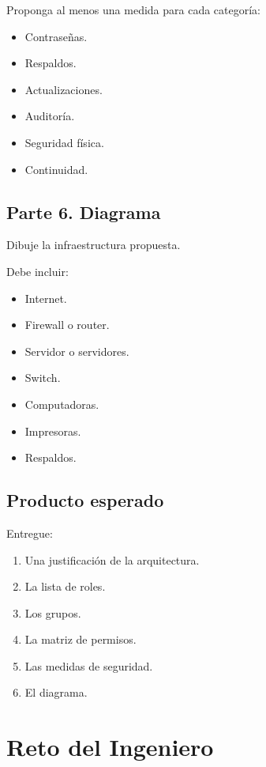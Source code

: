 \documentclass[
  spanish,
  letterpaper,
]{scrbook}
\providecommand{\tightlist}{%
  \setlength{\itemsep}{0pt}\setlength{\parskip}{0pt}}
\begin{document}
Proponga al menos una medida para cada categoría:

\begin{itemize}
\tightlist
\item
  Contraseñas.
\item
  Respaldos.
\item
  Actualizaciones.
\item
  Auditoría.
\item
  Seguridad física.
\item
  Continuidad.
\end{itemize}

\section{Parte 6. Diagrama}\label{parte-6.-diagrama}

Dibuje la infraestructura propuesta.

Debe incluir:

\begin{itemize}
\tightlist
\item
  Internet.
\item
  Firewall o router.
\item
  Servidor o servidores.
\item
  Switch.
\item
  Computadoras.
\item
  Impresoras.
\item
  Respaldos.
\end{itemize}

\section{Producto esperado}\label{producto-esperado}

Entregue:

\begin{enumerate}
\def\labelenumi{\arabic{enumi}.}
\tightlist
\item
  Una justificación de la arquitectura.
\item
  La lista de roles.
\item
  Los grupos.
\item
  La matriz de permisos.
\item
  Las medidas de seguridad.
\item
  El diagrama.
\end{enumerate}


\chapter{Reto del Ingeniero}\label{reto-del-ingeniero}
\end{document}
